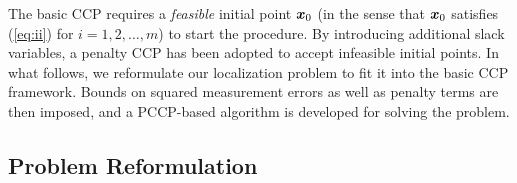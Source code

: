 \phantom{m}

\phantom{m}
 
The basic CCP requires a \textit{feasible} initial point $\mbox{\boldmath$x$}_0$ (in the sense that $\mbox{\boldmath$x$}_0$ satisfies (\ref{eq:ii}) for $ i = 1, 2, \ldots, m$)  to start the procedure. By introducing additional slack variables, a penalty CCP has been adopted to accept infeasible initial points. In what follows, we reformulate our localization problem to fit it into the basic CCP framework. Bounds on squared measurement errors as well as penalty terms are then imposed, and a PCCP-based algorithm is developed for solving the problem.


\subsection{Problem Reformulation}

